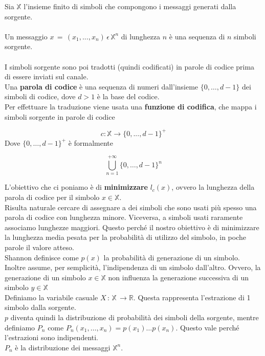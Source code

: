 \documentclass[12pt]{report}
\begin{document}
    \noindent Sia $\mathbb{X}$ l'insieme finito di simboli che compongono i messaggi generati dalla sorgente. \\ \\
    Un messaggio $x \, = \,(x_1,...,x_n)\, \epsilon \, \mathbb{X}^n$ di lunghezza $n$ è una sequenza di $n$ simboli sorgente.
    \\ \\
    I simboli sorgente sono poi tradotti (quindi codificati) in parole di codice prima di essere inviati sul canale. \\
    Una \textbf{parola di codice} è una sequenza di numeri dall'insieme $\{0,\dots,d-1\}$ dei simboli di codice, dove $d > 1$ è la base del codice.\\
    Per effettuare la traduzione viene usata una \textbf{funzione di codifica}, che mappa i simboli sorgente in parole di codice

    $$c : \mathbb{X} \rightarrow \{0,...,d-1\}^+$$
    Dove $\{0,\dots,d-1\}^+$ è formalmente

    $$\bigcup_{n=1}^{+\infty}\{0,\dots,d-1\}^n$$

    \noindent L'obiettivo che ci poniamo è di \textbf{minimizzare} $l_c(x)$, ovvero la lunghezza della parola di codice per il simbolo $x \in \mathbb{X}$. \\

    \noindent Risulta naturale cercare di assegnare a dei simboli che sono usati più spesso una parola di codice con lunghezza minore. Viceversa, a simboli usati raramente associamo lunghezze maggiori. Questo perché il nostro obiettivo è di minimizzare la lunghezza media pesata per la probabilità di utilizzo del simbolo, in poche parole il valore atteso. \\

    \noindent Shannon definisce come $p(x)$ la probabilità di generazione di un simbolo. Inoltre assume, per semplicità, l'indipendenza di un simbolo dall'altro. Ovvero, la generazione di un simbolo $x \in \mathbb{X}$ non influenza la generazione successiva di un simbolo $y \in \mathbb{X}$
    \\

    \noindent Definiamo la variabile casuale  $X\,:\, \mathbb{X} \, \rightarrow \mathbb{R}$. Questa rappresenta l'estrazione di 1 simbolo dalla sorgente. \\
    $p$ diventa quindi la distribuzione di probabilità dei simboli della sorgente, mentre definiamo $P_n$ come  $P_n(x_1,\dots,x_n) = p(x_1)\dots p(x_n)$. Questo vale perché l'estrazioni sono indipendenti. \\
    $P_n$ è la distribuzione dei messaggi $\mathbb{X}^n$. \\
\end{document}
